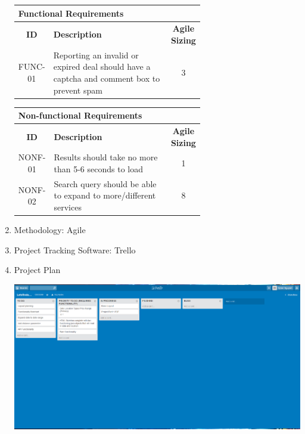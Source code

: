 \documentclass[11pt,letter]{article}
\begin{document}
\begin{enumerate}
\begin{center}
\begin{tabular}{|c|p{0.65\linewidth}|c|}
\hline
\multicolumn{3}{|l|}{\textbf{Functional Requirements}} \\
\hline
\textbf{ID} & \textbf{Description} & \textbf{Agile Sizing}\\
\hline
FUNC-01 & Reporting an invalid or expired deal should have a captcha and comment box to prevent spam & 3 \\
\hline
\end{tabular}
\end{center}

\begin{center}
\begin{tabular}{|c|p{0.65\linewidth}|c|}
\hline
\multicolumn{3}{|l|}{\textbf{Non-functional Requirements}} \\
\hline
\textbf{ID} & \textbf{Description} & \textbf{Agile Sizing} \\
\hline
NONF-01 & Results should take no more than 5-6 seconds to load & 1 \\
\hline
NONF-02 & Search query should be able to expand to more/different services & 8 \\
\hline
\end{tabular}
\end{center}
\item Methodology: Agile 
\item Project Tracking Software: Trello
\item Project Plan 
\pagebreak

\includegraphics[scale = 0.4, angle = 90]{plan.jpg}

\pagebreak


\end{enumerate}
\end{document}

